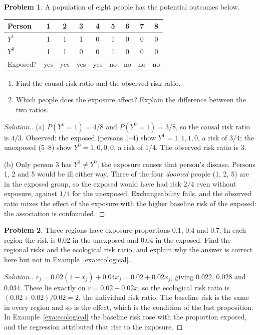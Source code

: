 \documentclass[11pt,a4paper]{article}
\numberwithin{equation}{section}
\theoremstyle{definition}
\newtheorem{problemx}{Problem}[subsection]
\newenvironment{problem}{\begin{problemx}}{\end{problemx}}
\newenvironment{solution}
  {\renewcommand{\qedsymbol}{}\begin{proof}[\textit{Solution}.]}
  {\end{proof}}
\begin{document}
\begin{problem}
\label{prob:po}
A population of eight people has the potential outcomes below.
\begin{center}
\begin{tabular}{lcccccccc}
\hline
Person & 1 & 2 & 3 & 4 & 5 & 6 & 7 & 8 \\
\hline
$Y^1$ & 1 & 1 & 1 & 0 & 1 & 0 & 0 & 0 \\
$Y^0$ & 1 & 1 & 0 & 0 & 1 & 0 & 0 & 0 \\
Exposed? & yes & yes & yes & yes & no & no & no & no \\
\hline
\end{tabular}
\end{center}
\begin{enumerate}[label=(\alph*)]
\item Find the causal risk ratio and the observed risk ratio.
\item Which people does the exposure affect? Explain the difference between the two ratios.
\end{enumerate}
\end{problem}

\begin{solution}
(a) $P(Y^1 = 1) = 4/8$ and $P(Y^0 = 1) = 3/8$, so the causal risk ratio is $4/3$. Observed: the exposed (persons 1--4) show $Y^1 = 1, 1, 1, 0$, a
risk of $3/4$; the unexposed (5--8) show $Y^0 = 1, 0, 0, 0$, a risk of $1/4$. The observed risk ratio is $3$.

(b) Only person 3 has $Y^1 \neq Y^0$; the exposure causes that person's disease. Persons 1, 2 and 5 would be ill either way. Three of the four
\emph{doomed} people (1, 2, 5) are in the exposed group, so the exposed would have had risk $2/4$ even without exposure, against $1/4$ for
the unexposed. Exchangeability fails, and the observed ratio mixes the effect of the exposure with the higher baseline risk of the
exposed: the association is confounded.
\end{solution}

\begin{problem}
Three regions have exposure proportions $0.1$, $0.4$ and $0.7$. In each region the risk is $0.02$ in the unexposed and $0.04$ in the exposed.
Find the regional risks and the ecological risk ratio, and explain why the answer is correct here but not in Example~\ref{exa:ecological}.
\end{problem}

\begin{solution}
$r_j = 0.02(1 - x_j) + 0.04x_j = 0.02 + 0.02x_j$, giving $0.022$, $0.028$ and $0.034$. These lie exactly on $r = 0.02 + 0.02x$, so the
ecological risk ratio is $(0.02 + 0.02)/0.02 = 2$, the individual risk ratio. The baseline risk is the same in every region and so is the effect,
which is the condition of the last proposition. In Example~\ref{exa:ecological} the baseline risk rose with the proportion exposed, and the
regression attributed that rise to the exposure.
\end{solution}
\end{document}
